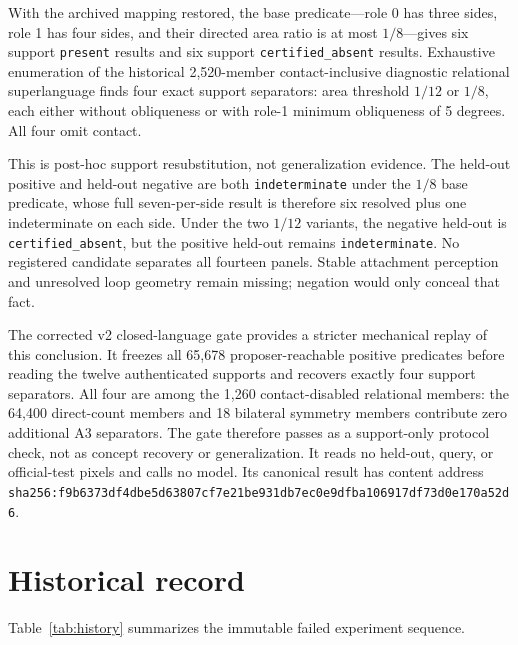 \documentclass[11pt]{article}
\begin{document}
With the archived mapping restored, the base predicate---role 0 has three
sides, role 1 has four sides, and their directed area ratio is at most
$1/8$---gives six support \texttt{present} results and six support
\texttt{certified\_absent} results.  Exhaustive enumeration of the historical
2,520-member contact-inclusive diagnostic relational superlanguage finds four
exact support separators: area threshold
$1/12$ or $1/8$, each either without obliqueness or with role-1 minimum
obliqueness of 5 degrees.  All four omit contact.

This is post-hoc support resubstitution, not generalization evidence.  The
held-out positive and held-out negative are both \texttt{indeterminate} under
the $1/8$ base predicate, whose full seven-per-side result is therefore six
resolved plus one indeterminate on each side.  Under the two $1/12$ variants,
the negative held-out is \texttt{certified\_absent}, but the positive held-out
remains \texttt{indeterminate}.  No registered candidate separates all
fourteen panels.  Stable attachment perception and unresolved loop geometry
remain missing; negation would only conceal that fact.

The corrected v2 closed-language gate provides a stricter mechanical replay of
this conclusion.  It freezes all 65,678 proposer-reachable positive predicates
before reading the twelve authenticated supports and recovers exactly four
support separators.  All four are among the 1,260 contact-disabled relational
members: the 64,400 direct-count members and 18 bilateral symmetry members
contribute zero additional A3 separators.  The gate therefore
passes as a support-only protocol check, not as concept recovery or
generalization.  It reads no held-out, query, or official-test pixels and calls
no model.  Its canonical result has content address
\texttt{sha256:f9b6373df4dbe5d63807cf7e21be931db7ec0e9dfba106917df73d0e170a52d6}.

\section{Historical record}

Table~\ref{tab:history} summarizes the immutable failed experiment sequence.
\end{document}

